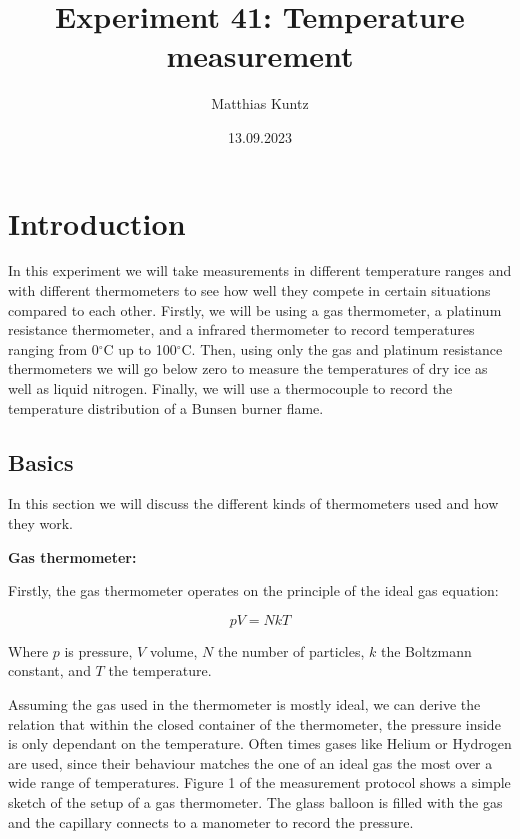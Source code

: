 \documentclass{article}
\title{Experiment 41: Temperature measurement}
\author{Matthias Kuntz}
\date{13.09.2023}
\begin{document}
\maketitle

\section{Introduction}

In this experiment we will take measurements in different temperature ranges and with different thermometers to see how well they compete in certain situations compared to each other. Firstly, we will be using a gas thermometer, a platinum resistance thermometer, and a infrared thermometer to record temperatures ranging from 0$^{\circ}$C up to 100$^{\circ}$C. Then, using only the gas and platinum resistance thermometers we will go below zero to measure the temperatures of dry ice as well as liquid nitrogen. Finally, we will use a thermocouple to record the temperature distribution of a Bunsen burner flame.

\subsection{Basics}

In this section we will discuss the different kinds of thermometers used and how they work.

\textbf{Gas thermometer:}

Firstly, the gas thermometer operates on the principle of the ideal gas equation:

\begin{equation}
    pV = NkT
\end{equation}

Where $p$ is pressure, $V$ volume, $N$ the number of particles, $k$ the Boltzmann constant, and $T$ the temperature. 

Assuming the gas used in the thermometer is mostly ideal, we can derive the relation that within the closed container of the thermometer, the pressure inside is only dependant on the temperature. Often times gases like Helium or Hydrogen  are used, since their behaviour matches the one of an ideal gas the most over a wide range of temperatures. Figure 1 of the measurement protocol shows a simple sketch of the setup of a gas thermometer. The glass balloon is filled with the gas and the capillary connects to a manometer to record the pressure.
\end{document}
